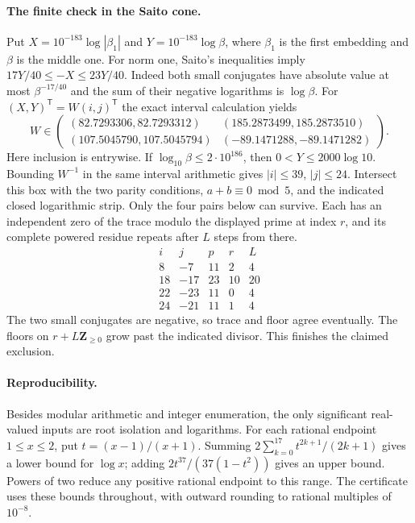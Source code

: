 \documentclass[11pt,a4paper,oneside,openany]{book}
\begin{document}
\paragraph{The finite check in the Saito cone.}
Put $X=10^{-183}\log|\beta_1|$ and $Y=10^{-183}\log\beta$,
where $\beta_1$ is the first embedding and $\beta$ is the middle one.
For norm one, Saito's inequalities imply
$17Y/40\le-X\le23Y/40$. Indeed both small conjugates have absolute value
at most $\beta^{-17/40}$ and the sum of their negative logarithms is
$\log\beta$. For $(X,Y)^{\mathsf T}=W(i,j)^{\mathsf T}$ the exact
interval calculation yields
\[
 W\in\begin{pmatrix}
  (82.7293306,82.7293312)&(185.2873499,185.2873510)\\
  (107.5045790,107.5045794)&(-89.1471288,-89.1471282)
 \end{pmatrix}.
\]
Here inclusion is entrywise. If $\log_{10}\beta\le 2\cdot10^{186}$, then
$0<Y\le2000\log 10$. Bounding $W^{-1}$ in the same interval
arithmetic gives $|i|\le39$, $|j|\le24$. Intersect this box with the
two parity conditions, $a+b\equiv0\bmod5$, and the indicated closed
logarithmic strip. Only the four pairs below can survive. Each has an
independent zero of the trace modulo the displayed prime at index $r$,
and its complete powered residue repeats after $L$ steps from there.
\[
 \begin{array}{rr|rrr}
 i&j&p&r&L\\\hline
 8&-7&11&2&4\\18&-17&23&10&20\\22&-23&11&0&4\\24&-21&11&1&4
 \end{array}
\]
The two small conjugates are negative, so trace and floor agree eventually.
The floors on $r+L\mathbf Z_{\ge0}$ grow past the indicated divisor.
This finishes the claimed exclusion.

\paragraph{Reproducibility.}
Besides modular arithmetic and integer enumeration, the only significant
real-valued inputs are root isolation and logarithms. For each rational
endpoint $1\le x\le2$, put $t=(x-1)/(x+1)$. Summing
$2\sum_{k=0}^{17}t^{2k+1}/(2k+1)$ gives a lower bound for $\log x$;
adding $2t^{37}/(37(1-t^2))$ gives an upper bound. Powers of two reduce
any positive rational endpoint to this range. The certificate uses these
bounds throughout, with outward rounding to rational multiples of $10^{-8}$.
\end{document}
